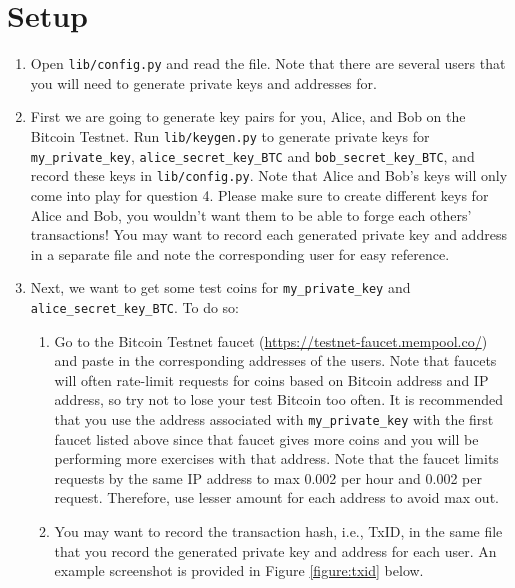 \documentclass[11pt]{article}
\begin{document}
\section{Setup}
\begin{enumerate}
    \item Open \texttt{lib/config.py} and read the file. Note that there are several users that you will need to generate private keys and addresses for.
    \item First we are going to generate key pairs for you, Alice, and Bob on the Bitcoin Testnet. Run \texttt{lib/keygen.py} to generate private keys for \texttt{my\_private\_key}, \texttt{alice\_secret\_key\_BTC} and \texttt{bob\_secret\_key\_BTC}, and record these keys in \texttt{lib/config.py}. Note that Alice and Bob's keys will only come into play for question 4. Please make sure to create different keys for Alice and Bob, you wouldn't want them to be able to forge each others' transactions! You may want to record each generated private key and address in a separate file and note the corresponding user for easy reference.
    \item Next, we want to get some test coins for \texttt{my\_private\_key} and  \texttt{alice\_secret\_key\_BTC}. To do so: \begin{enumerate}
        \item Go to the Bitcoin Testnet faucet
        (\href{https://testnet-faucet.mempool.co/}{https://testnet-faucet.mempool.co/}) and paste in the corresponding addresses of the users.
        Note that faucets will often rate-limit requests for coins based on Bitcoin address and IP address, so try not to lose your test Bitcoin too often. It is recommended that you use the address associated with \texttt{my\_private\_key} with the first faucet listed above since that faucet gives more coins and you will be performing more exercises with that address. Note that the faucet limits requests by the same IP address to  max 0.002 per hour and 0.002  per request. Therefore, use lesser amount for each address to avoid max out.


        \item You may want to record the transaction hash, i.e., TxID, in the same file that you record the generated private key and address for each user. An example screenshot is provided in Figure \ref{figure:txid} below.

\begin{figure}[h!]


\end{figure}
\end{enumerate}
\end{enumerate}
\end{document}
